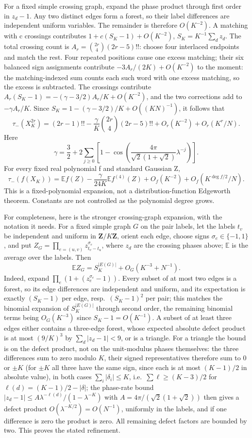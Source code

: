 For a fixed simple crossing graph, expand the phase product through first
order in $z_d-1$. Any two distinct edges form a forest, so their label
differences are independent uniform variables. The remainder is therefore
$O(K^{-2})$. A matching with c crossings contributes
$1+c(S_K-1)+O(K^{-2})$, $S_K=K^{-1}\sum_dz_d$. The total crossing count is
$A_r=\binom{2r}{4}(2r-5)!!$: choose four interlaced endpoints and match the
rest. Four repeated positions cause one excess matching; their six balanced
sign assignments contribute $-3A_r/(2K)+O(K^{-2})$ to the moment: the
matching-indexed sum counts each such word with one excess matching, so
the excess is subtracted. The crossings contribute
$A_r(S_K-1)=-(\gamma-3/2)A_r/K+O(K^{-2})$, and the two corrections add
to $-\gamma A_r/K$. Since
$S_K=1-(\gamma-3/2)/K+O((KN)^{-1})$, it follows that
\begin{equation}\label{eq:edgeworth-mom}
 \tau_-(X_K^{2r})=(2r-1)!!-
       \frac{\gamma}{K}\binom{2r}{4}(2r-5)!!
       +O_r(K^{-2})+O_r(K^r/N).
\end{equation}
Here
\[
 \gamma=\frac32+2\sum_{j\geq0}
 \left[1-\cos\left(\frac{4\pi}{\sqrt2(1+\sqrt2)}\lambda^{-j}\right)\right].
\]
For every fixed real polynomial f and standard Gaussian Z,
\[
 \tau_-(f(X_K))=\mathbb Ef(Z)-\frac{\gamma}{24K}\mathbb Ef^{(4)}(Z)
             +O_f(K^{-2})+O_f(K^{\deg f/2}/N).
\]
This is a fixed-polynomial expansion, not a distribution-function Edgeworth
theorem. Constants are not controlled as the polynomial degree grows.

For completeness, here is the stronger crossing-graph expansion, with the
notation it needs. For a fixed simple graph $G$ on the pair labels, let
the labels $t_v$ be independent and uniform in $\mathbf Z/K\mathbf Z$,
orient each edge, choose signs $\sigma_e\in\{-1,1\}$, and put
$Z_G=\prod_{e=(u,v)}z_{t_v-t_u}^{\sigma_e}$, where $z_d$ are the crossing
phases above; $\mathbb E$ is the average over the labels. Then
\[
 \mathbb E Z_G=S_K^{|E(G)|}+O_G(K^{-3}+N^{-1}).
\]
Indeed, expand $\prod_e(1+(z_e^{\sigma_e}-1))$. Every subset of at most
two edges is a forest, so its edge differences are independent and
uniform, and its expectation is exactly $(S_K-1)$ per edge, resp.\
$(S_K-1)^2$ per pair; this matches the binomial expansion of
$S_K^{|E(G)|}$ through second order, the remaining binomial terms being
$O_G(K^{-3})$ since $S_K-1=O(K^{-1})$. A subset of at least three edges
either contains a three-edge forest, whose expected absolute defect
product is at most $(9/K)^3$ by $\sum_d|z_d-1|<9$, or is a triangle. For
a triangle the bound is on the defect product, not on the unit-modulus
phases themselves: the three differences sum to zero modulo $K$, their
signed representatives therefore sum to $0$ or $\pm K$ (for $\pm K$ all
three have the same sign, since each is at most $(K-1)/2$ in absolute
value), in both cases
$\sum_i|\delta_i|\le K$, i.e.\ $\sum\ell\geq(K-3)/2$ for
$\ell(d)=(K-1)/2-|\delta|$; the phase-rate bound
$|z_d-1|\le A\lambda^{-\ell(d)}/(1-\lambda^{-K})$ with
$A=4\pi/(\sqrt2(1+\sqrt2))$ then gives a defect product
$O(\lambda^{-K/2})=O(N^{-1})$, uniformly in the labels, and if one
difference is zero the product is zero. All remaining defect factors are
bounded by two. This proves the stated refinement.

